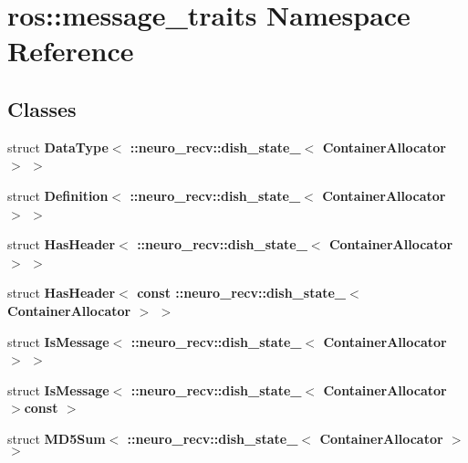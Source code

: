 \section{ros\-:\-:message\-\_\-traits \-Namespace \-Reference}
\label{namespaceros_1_1message__traits}
\subsection*{\-Classes}
\begin{DoxyCompactItemize}
\item 
struct {\bf \-Data\-Type$<$ \-::neuro\-\_\-recv\-::dish\-\_\-state\-\_\-$<$ Container\-Allocator $>$ $>$}
\item 
struct {\bf \-Definition$<$ \-::neuro\-\_\-recv\-::dish\-\_\-state\-\_\-$<$ Container\-Allocator $>$ $>$}
\item 
struct {\bf \-Has\-Header$<$ \-::neuro\-\_\-recv\-::dish\-\_\-state\-\_\-$<$ Container\-Allocator $>$ $>$}
\item 
struct {\bf \-Has\-Header$<$ const \-::neuro\-\_\-recv\-::dish\-\_\-state\-\_\-$<$ Container\-Allocator $>$ $>$}
\item 
struct {\bf \-Is\-Message$<$ \-::neuro\-\_\-recv\-::dish\-\_\-state\-\_\-$<$ Container\-Allocator $>$ $>$}
\item 
struct {\bf \-Is\-Message$<$ \-::neuro\-\_\-recv\-::dish\-\_\-state\-\_\-$<$ Container\-Allocator $>$const  $>$}
\item 
struct {\bf \-M\-D5\-Sum$<$ \-::neuro\-\_\-recv\-::dish\-\_\-state\-\_\-$<$ Container\-Allocator $>$ $>$}
\end{DoxyCompactItemize}
